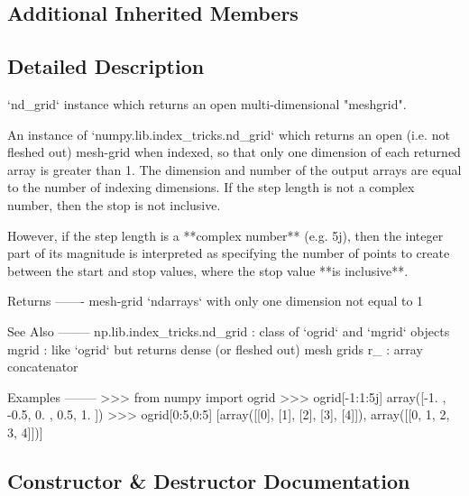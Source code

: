 \subsection*{Additional Inherited Members}


\subsection{Detailed Description}
\begin{DoxyVerb}`nd_grid` instance which returns an open multi-dimensional "meshgrid".

An instance of `numpy.lib.index_tricks.nd_grid` which returns an open
(i.e. not fleshed out) mesh-grid when indexed, so that only one dimension
of each returned array is greater than 1.  The dimension and number of the
output arrays are equal to the number of indexing dimensions.  If the step
length is not a complex number, then the stop is not inclusive.

However, if the step length is a **complex number** (e.g. 5j), then
the integer part of its magnitude is interpreted as specifying the
number of points to create between the start and stop values, where
the stop value **is inclusive**.

Returns
-------
mesh-grid
    `ndarrays` with only one dimension not equal to 1

See Also
--------
np.lib.index_tricks.nd_grid : class of `ogrid` and `mgrid` objects
mgrid : like `ogrid` but returns dense (or fleshed out) mesh grids
r_ : array concatenator

Examples
--------
>>> from numpy import ogrid
>>> ogrid[-1:1:5j]
array([-1. , -0.5,  0. ,  0.5,  1. ])
>>> ogrid[0:5,0:5]
[array([[0],
        [1],
        [2],
        [3],
        [4]]), array([[0, 1, 2, 3, 4]])]\end{DoxyVerb}
 

\subsection{Constructor \& Destructor Documentation}
\mbox{\label{classnumpy_1_1lib_1_1index__tricks_1_1OGridClass_a600b1050de50f33c2fe60341f298f2eb}} 
